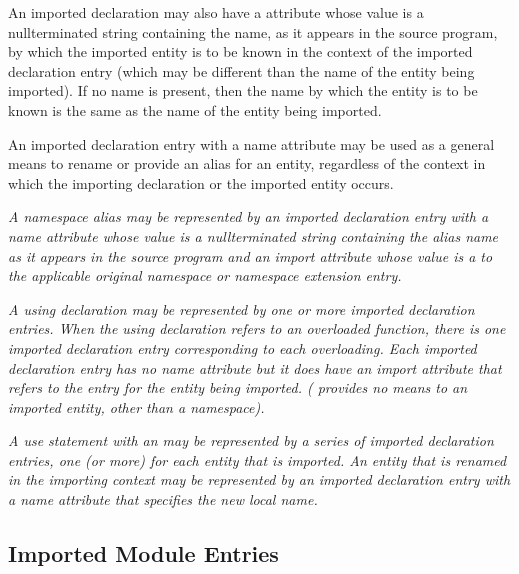An imported declaration may also have a 
\DWATname{}
attribute
whose value is a null\dash terminated string containing the
name, as it appears in the source program, by which the
imported entity is to be known in the context of the imported
declaration entry (which may be different than the name of
the entity being imported). If no name is present, then the
name by which the entity is to be known is the same as the
name of the entity being imported.

An imported declaration entry with a name attribute may be
used as a general means to rename or provide an alias for
an entity, regardless of the context in which the importing
declaration or the imported entity occurs.

\textit{A  namespace alias may be represented by an imported
\hypertarget{chap:DWATimportnamespacealias}{}
declaration entry 
with a name attribute whose value is
a null\dash terminated string containing the alias name as it
appears in the source program and an import attribute whose
value is a  to the applicable original namespace or
namespace extension entry.
}

\textit{A  using declaration may be represented by one or more
\hypertarget{chap:DWATimportnamespaceusingdeclaration}{}
imported 
declaration entries.  When the using declaration
refers to an overloaded function, there is one imported
declaration entry corresponding to each overloading. Each
imported declaration entry has no name attribute but it does
have an import attribute that refers to the entry for the
entity being imported. ( 
provides no means to 
an imported entity, other than a namespace).
}

\textit{A  use statement 
with an  may be
represented by a series of imported declaration entries,
one (or more) for each entity that is imported. An entity
that is renamed in the importing context may be represented
by an imported declaration entry with a name attribute that
specifies the new local name.
}

\subsection{Imported Module Entries}
\label{chap:importedmoduleentries}

